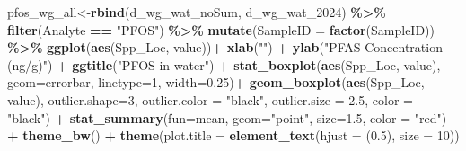 \documentclass[
]{article}
\newenvironment{Shaded}{\begin{snugshade}}{\end{snugshade}}
\newcommand{\AttributeTok}[1]{\textcolor[rgb]{0.13,0.29,0.53}{#1}}
\newcommand{\DecValTok}[1]{\textcolor[rgb]{0.00,0.00,0.81}{#1}}
\newcommand{\FloatTok}[1]{\textcolor[rgb]{0.00,0.00,0.81}{#1}}
\newcommand{\FunctionTok}[1]{\textcolor[rgb]{0.13,0.29,0.53}{\textbf{#1}}}
\newcommand{\NormalTok}[1]{#1}
\newcommand{\OtherTok}[1]{\textcolor[rgb]{0.56,0.35,0.01}{#1}}
\newcommand{\SpecialCharTok}[1]{\textcolor[rgb]{0.81,0.36,0.00}{\textbf{#1}}}
\newcommand{\StringTok}[1]{\textcolor[rgb]{0.31,0.60,0.02}{#1}}
\begin{document}
\begin{Shaded}
\begin{Highlighting}[]
\NormalTok{pfos\_wg\_all}\OtherTok{\textless{}{-}}\FunctionTok{rbind}\NormalTok{(d\_wg\_wat\_noSum, d\_wg\_wat\_2024) }\SpecialCharTok{\%\textgreater{}\%} 
  \FunctionTok{filter}\NormalTok{(Analyte }\SpecialCharTok{==} \StringTok{"PFOS"}\NormalTok{) }\SpecialCharTok{\%\textgreater{}\%} 
  \FunctionTok{mutate}\NormalTok{(}\AttributeTok{SampleID =} \FunctionTok{factor}\NormalTok{(SampleID)) }\SpecialCharTok{\%\textgreater{}\%} 
  \FunctionTok{ggplot}\NormalTok{(}\FunctionTok{aes}\NormalTok{(Spp\_Loc, value))}\SpecialCharTok{+}
    \FunctionTok{xlab}\NormalTok{(}\StringTok{""}\NormalTok{) }\SpecialCharTok{+}
    \FunctionTok{ylab}\NormalTok{(}\StringTok{"PFAS Concentration (ng/g)"}\NormalTok{) }\SpecialCharTok{+}
    \FunctionTok{ggtitle}\NormalTok{(}\StringTok{"PFOS in water"}\NormalTok{) }\SpecialCharTok{+}
    \FunctionTok{stat\_boxplot}\NormalTok{(}\FunctionTok{aes}\NormalTok{(Spp\_Loc, value),}
                 \AttributeTok{geom=}\StringTok{\textquotesingle{}errorbar\textquotesingle{}}\NormalTok{, }\AttributeTok{linetype=}\DecValTok{1}\NormalTok{, }\AttributeTok{width=}\FloatTok{0.25}\NormalTok{)}\SpecialCharTok{+}
    \FunctionTok{geom\_boxplot}\NormalTok{(}\FunctionTok{aes}\NormalTok{(Spp\_Loc, value),}
                 \AttributeTok{outlier.shape=}\DecValTok{3}\NormalTok{,}
                 \AttributeTok{outlier.color =} \StringTok{"black"}\NormalTok{,}
                 \AttributeTok{outlier.size =} \FloatTok{2.5}\NormalTok{,}
                 \AttributeTok{color =} \StringTok{"black"}\NormalTok{) }\SpecialCharTok{+} 
    \FunctionTok{stat\_summary}\NormalTok{(}\AttributeTok{fun=}\NormalTok{mean, }\AttributeTok{geom=}\StringTok{"point"}\NormalTok{, }\AttributeTok{size=}\FloatTok{1.5}\NormalTok{, }\AttributeTok{color =} \StringTok{"red"}\NormalTok{) }\SpecialCharTok{+}
    \FunctionTok{theme\_bw}\NormalTok{() }\SpecialCharTok{+}
    \FunctionTok{theme}\NormalTok{(}\AttributeTok{plot.title =} \FunctionTok{element\_text}\NormalTok{(}\AttributeTok{hjust =}\NormalTok{ (}\FloatTok{0.5}\NormalTok{), }\AttributeTok{size =} \DecValTok{10}\NormalTok{))}


\end{Highlighting}
\end{Shaded}
\end{document}
